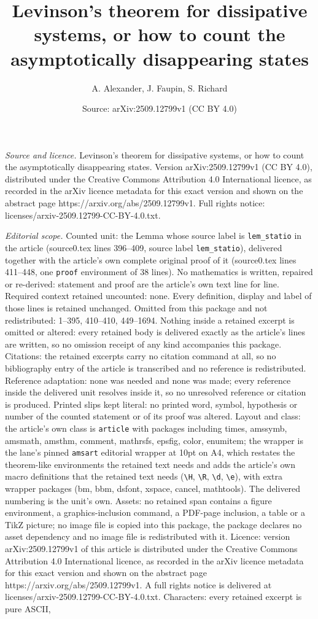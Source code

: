 \documentclass[10pt,a4paper]{amsart}
\title[Levinson's theorem for dissipative systems, or how to count ]{Levinson's theorem for dissipative systems, or how to count the asymptotically disappearing states}
\author{A. Alexander, J. Faupin, S. Richard}
\date{Source: arXiv:2509.12799v1 (CC BY 4.0)}
\begin{document}
\maketitle

\noindent\emph{Source and licence.} Levinson's theorem for dissipative systems, or how to count the asymptotically disappearing states. Version arXiv:2509.12799v1 (CC BY 4.0), distributed under the Creative Commons Attribution 4.0 International licence, as recorded in the arXiv licence metadata for this exact version and shown on the abstract page https://arxiv.org/abs/2509.12799v1. Full rights notice: licenses/arxiv-2509.12799-CC-BY-4.0.txt.\par\smallskip

\noindent\textit{Editorial scope.} Counted unit: the Lemma whose source label is \texttt{lem\_statio} in the article (source0.tex lines 396--409, source label \texttt{lem\_statio}), delivered together with the article's own complete original proof of it (source0.tex lines 411--448, one \texttt{proof} environment of 38 lines). No mathematics is written, repaired or re-derived: statement and proof are the article's own text line for line. Required context retained uncounted: none. Every definition, display and label of those lines is retained unchanged. Omitted from this package and not redistributed: 1--395, 410--410, 449--1694. Nothing inside a retained excerpt is omitted or altered: every retained body is delivered exactly as the article's lines are written, so no omission receipt of any kind accompanies this package. Citations: the retained excerpts carry no citation command at all, so no bibliography entry of the article is transcribed and no reference is redistributed. Reference adaptation: none was needed and none was made; every reference inside the delivered unit resolves inside it, so no unresolved reference or citation is produced. Printed slips kept literal: no printed word, symbol, hypothesis or number of the counted statement or of its proof was altered. Layout and class: the article's own class is \texttt{article} with packages including times, amssymb, amsmath, amsthm, comment, mathrsfs, epsfig, color, enumitem; the wrapper is the lane's pinned \texttt{amsart} editorial wrapper at 10pt on A4, which restates the theorem-like environments the retained text needs and adds the article's own macro definitions that the retained text needs (\texttt{\textbackslash H}, \texttt{\textbackslash R}, \texttt{\textbackslash d}, \texttt{\textbackslash e}), with extra wrapper packages (bm, bbm, dsfont, xspace, cancel, mathtools). The delivered numbering is the unit's own. Assets: no retained span contains a figure environment, a graphics-inclusion command, a PDF-page inclusion, a table or a TikZ picture; no image file is copied into this package, the package declares no asset dependency and no image file is redistributed with it. Licence: version arXiv:2509.12799v1 of this article is distributed under the Creative Commons Attribution 4.0 International licence, as recorded in the arXiv licence metadata for this exact version and shown on the abstract page https://arxiv.org/abs/2509.12799v1. A full rights notice is delivered at licenses/arxiv-2509.12799-CC-BY-4.0.txt. Characters: every retained excerpt is pure ASCII, 
\end{document}
